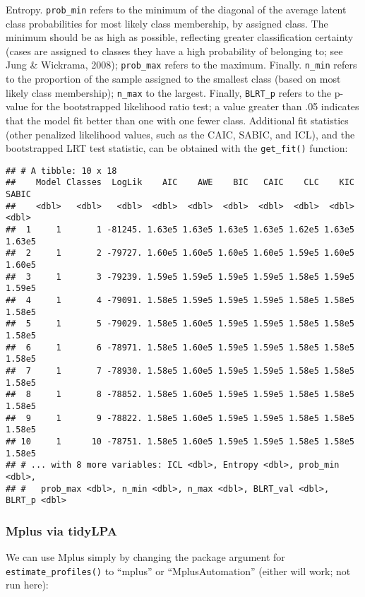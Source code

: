 \documentclass[man]{apa6}
\begin{document}
Entropy. \texttt{prob\_min} refers to the minimum of the diagonal of the average latent class probabilities for most likely class membership, by assigned class. The minimum should be as high as possible, reflecting greater classification certainty (cases are assigned to classes they have a high probability of belonging to; see Jung \& Wickrama, 2008); \texttt{prob\_max}
refers to the maximum. Finally. \texttt{n\_min} refers to the proportion of the sample assigned to the smallest class (based on most likely class membership); \texttt{n\_max} to the largest. Finally, \texttt{BLRT\_p} refers to the p-value for the bootstrapped likelihood ratio test; a value greater than .05 indicates that the model fit better than one with one fewer class.
Additional fit statistics (other penalized likelihood values, such as the CAIC, SABIC, and ICL), and the bootstrapped LRT
test statistic, can be obtained with the \texttt{get\_fit()} function:

\begin{verbatim}
## # A tibble: 10 x 18
##    Model Classes  LogLik    AIC    AWE    BIC   CAIC    CLC    KIC  SABIC
##    <dbl>   <dbl>   <dbl>  <dbl>  <dbl>  <dbl>  <dbl>  <dbl>  <dbl>  <dbl>
##  1     1       1 -81245. 1.63e5 1.63e5 1.63e5 1.63e5 1.62e5 1.63e5 1.63e5
##  2     1       2 -79727. 1.60e5 1.60e5 1.60e5 1.60e5 1.59e5 1.60e5 1.60e5
##  3     1       3 -79239. 1.59e5 1.59e5 1.59e5 1.59e5 1.58e5 1.59e5 1.59e5
##  4     1       4 -79091. 1.58e5 1.59e5 1.59e5 1.59e5 1.58e5 1.58e5 1.58e5
##  5     1       5 -79029. 1.58e5 1.60e5 1.59e5 1.59e5 1.58e5 1.58e5 1.58e5
##  6     1       6 -78971. 1.58e5 1.60e5 1.59e5 1.59e5 1.58e5 1.58e5 1.58e5
##  7     1       7 -78930. 1.58e5 1.60e5 1.59e5 1.59e5 1.58e5 1.58e5 1.58e5
##  8     1       8 -78852. 1.58e5 1.60e5 1.59e5 1.59e5 1.58e5 1.58e5 1.58e5
##  9     1       9 -78822. 1.58e5 1.60e5 1.59e5 1.59e5 1.58e5 1.58e5 1.58e5
## 10     1      10 -78751. 1.58e5 1.60e5 1.59e5 1.59e5 1.58e5 1.58e5 1.58e5
## # ... with 8 more variables: ICL <dbl>, Entropy <dbl>, prob_min <dbl>,
## #   prob_max <dbl>, n_min <dbl>, n_max <dbl>, BLRT_val <dbl>, BLRT_p <dbl>
\end{verbatim}

\hypertarget{mplus-via-tidylpa}{%
\subsubsection{Mplus via tidyLPA}\label{mplus-via-tidylpa}}

We can use Mplus simply by changing the package argument for
\texttt{estimate\_profiles()} to \enquote{mplus} or \enquote{MplusAutomation} (either will work; not run here):
\end{document}
